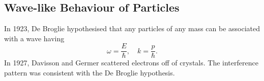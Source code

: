 \documentclass[12pt]{article}
\theoremstyle{definition}
\theoremstyle{remark}
\begin{document}
\subsection{Wave-like Behaviour of Particles}%
\label{sub:wave_like_behaviour_of_particles}

In 1923, De Broglie hypothesised that any particles of any mass can be associated with a wave having
\[
\omega = \frac{E}{\hbar}, \quad k = \frac{p}{\hbar}
.\]
In 1927, Davisson and Germer scattered electrons off of crystals. The interference pattern was consistent with the De Broglie hypothesis.


\newpage

\printindex
\end{document}
